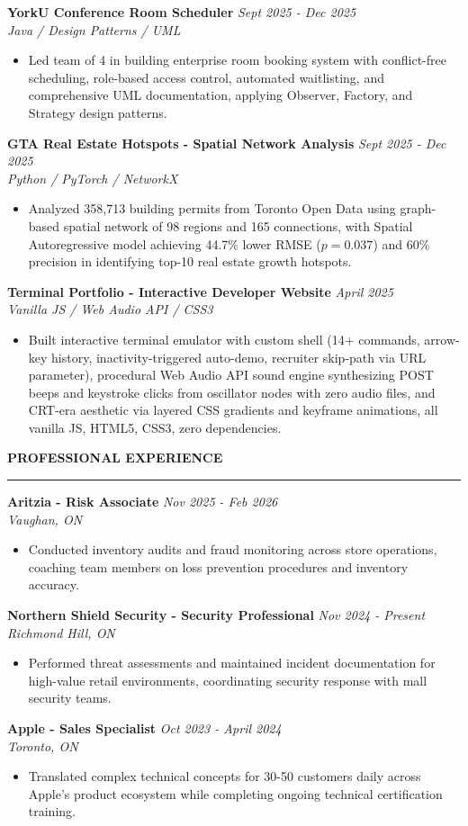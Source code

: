 \documentclass[10pt,letterpaper]{article}
\newcommand{\resumesection}[1]{%
  \vspace{5pt}
  \noindent\textsc{\textbf{\large #1}}
  \vspace{1pt}
  \hrule
  \vspace{2pt}
}
\newcommand{\resumeentry}[3]{%
  \noindent\textbf{#1} \hfill \textit{#2} \\
  \noindent\textit{#3}
}
\newcommand{\resumebullet}[1]{%
  \begin{itemize}[leftmargin=13pt,topsep=0pt,itemsep=0pt,partopsep=0pt]
    \item #1
  \end{itemize}
}
\begin{document}
\resumeentry{YorkU Conference Room Scheduler}{Sept 2025 - Dec 2025}{Java / Design Patterns / UML}
\resumebullet{Led team of 4 in building enterprise room booking system with conflict-free scheduling, role-based access control, automated waitlisting, and comprehensive UML documentation, applying Observer, Factory, and Strategy design patterns.}

\resumeentry{GTA Real Estate Hotspots - Spatial Network Analysis}{Sept 2025 - Dec 2025}{Python / PyTorch / NetworkX}
\resumebullet{Analyzed 358,713 building permits from Toronto Open Data using graph-based spatial network of 98 regions and 165 connections, with Spatial Autoregressive model achieving 44.7\% lower RMSE ($p = 0.037$) and 60\% precision in identifying top-10 real estate growth hotspots.}

\resumeentry{Terminal Portfolio - Interactive Developer Website}{April 2025}{Vanilla JS / Web Audio API / CSS3}
\resumebullet{Built interactive terminal emulator with custom shell (14+ commands, arrow-key history, inactivity-triggered auto-demo, recruiter skip-path via URL parameter), procedural Web Audio API sound engine synthesizing POST beeps and keystroke clicks from oscillator nodes with zero audio files, and CRT-era aesthetic via layered CSS gradients and keyframe animations, all vanilla JS, HTML5, CSS3, zero dependencies.}

\resumesection{PROFESSIONAL EXPERIENCE}

\resumeentry{Aritzia - Risk Associate}{Nov 2025 - Feb 2026}{Vaughan, ON}
\resumebullet{Conducted inventory audits and fraud monitoring across store operations, coaching team members on loss prevention procedures and inventory accuracy.}

\resumeentry{Northern Shield Security - Security Professional}{Nov 2024 - Present}{Richmond Hill, ON}
\resumebullet{Performed threat assessments and maintained incident documentation for high-value retail environments, coordinating security response with mall security teams.}

\resumeentry{Apple - Sales Specialist}{Oct 2023 - April 2024}{Toronto, ON}
\resumebullet{Translated complex technical concepts for 30-50 customers daily across Apple's product ecosystem while completing ongoing technical certification training.}
\end{document}
